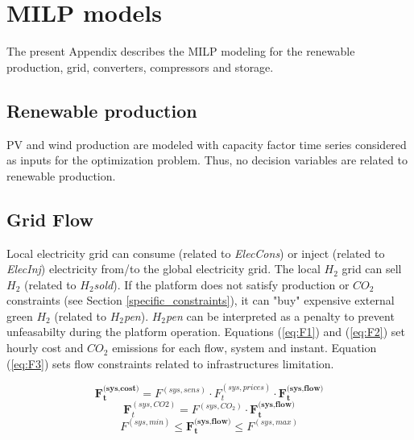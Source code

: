 \section{MILP models} \label{app:model}
The present Appendix describes the MILP modeling for the renewable production, grid, converters, compressors and storage.
\subsection{Renewable production} \label{Renewable_production}

PV and wind production are modeled with capacity factor time series considered as inputs for the optimization problem. Thus, no decision variables are related to renewable production.

\subsection{Grid Flow} \label{Grid_Flow} \label{eq:F}
Local electricity grid can consume (related to \textit{ElecCons}) or inject (related to \textit{ElecInj}) electricity from/to the global electricity grid. The local $H_2$ grid can sell $H_2$ (related to \textit{$H_2$sold}). If the platform does not satisfy production or $CO_2$ constraints (see Section \ref{specific_constraints}), it can "buy" expensive external green $H_2$ (related to \textit{$H_2$pen}). \textit{$H_2$pen} can be interpreted as a penalty to prevent unfeasabilty during the platform operation. Equations (\ref{eq:F1}) and (\ref{eq:F2}) set hourly cost and $CO_2$ emissions for each flow, system and instant. Equation (\ref{eq:F3}) sets flow constraints related to infrastructures limitation.

\begin{equation} \tag{F.1} \label{eq:F1}
    \textbf{F}_\textbf{t}^{\textbf{(sys,cost)}} = F^{(sys,sens)} \cdot F_t^{(sys,prices)} \cdot \textbf{F}_\textbf{t}^{\textbf{(sys,flow)}}
\end{equation}
\begin{equation} \tag{F.2} \label{eq:F2}
    \textbf{F}_t^{(sys,CO2)} = F^{(sys,CO_2)} \cdot \textbf{F}_\textbf{t}^{\textbf{(sys,flow)}}
\end{equation}
\begin{equation} \tag{F.3} \label{eq:F3}
    F^{(sys,min)} \leq \textbf{F}_\textbf{t}^{\textbf{(sys,flow)}} \leq F^{(sys,max)}
\end{equation}

